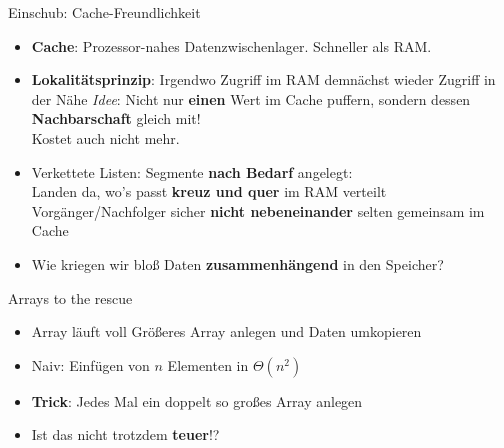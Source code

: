 \begin{frame}{Einschub: Cache-Freundlichkeit}
	\begin{itemize}
		\item \textbf{Cache}: Prozessor-nahes Datenzwischenlager. Schneller als RAM.
		\pause
		\item \textbf{Lokalitätsprinzip}: Irgendwo Zugriff im RAM \impl demnächst wieder Zugriff in der Nähe
		\pause
		\implitem \textit{Idee}: Nicht nur \textbf{einen} Wert im Cache puffern, sondern dessen \textbf{Nachbarschaft} gleich mit! \\
		Kostet auch nicht mehr.
		\pause
		\item Verkettete Listen: Segmente \textbf{nach Bedarf} angelegt: \\ Landen da, wo's passt \impl \textbf{kreuz und quer} im RAM verteilt
		\pause 
		\implitem Vorgänger/Nachfolger sicher \textbf{nicht nebeneinander} \impl selten gemeinsam im Cache
		\pause
		\item Wie kriegen wir bloß Daten \textbf{zusammenhängend} in den Speicher?
		
	\end{itemize}
\end{frame}


\begin{frame}{Arrays to the rescue}
	\begin{itemize}
		\item Array läuft voll \impl Größeres Array anlegen und Daten umkopieren
		\pause
		\item Naiv: Einfügen von $n$ Elementen in $\Theta(n^2)$
		\pause
		\item \textbf{Trick}: Jedes Mal ein doppelt so großes Array anlegen
		\item Ist das nicht trotzdem \textbf{teuer}!?
	\end{itemize}
\end{frame}

